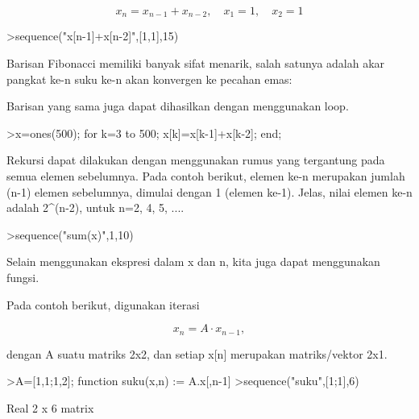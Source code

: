 \documentclass[a4paper,10pt]{article}
\begin{document}
\begin{eulernotebook}
\begin{eulercomment}
\begin{eulercomment}
\begin{eulercomment}
\end{eulercomment}
\begin{eulerformula}
\[
x_n = x_{n-1}+x_{n-2}, \quad x_1=1, \quad x_2 =1
\]
\end{eulerformula}
\begin{eulerprompt}
>sequence("x[n-1]+x[n-2]",[1,1],15)
\end{eulerprompt}
\begin{euleroutput}
  [1,  1,  2,  3,  5,  8,  13,  21,  34,  55,  89,  144,  233,  377,  610]
\end{euleroutput}
\begin{eulercomment}
Barisan Fibonacci memiliki banyak sifat menarik, salah satunya adalah akar pangkat ke-n suku
ke-n akan konvergen ke pecahan emas:
\end{eulercomment}
\begin{eulercomment}
Barisan yang sama juga dapat dihasilkan dengan menggunakan loop.
\end{eulercomment}
\begin{eulerprompt}
>x=ones(500); for k=3 to 500; x[k]=x[k-1]+x[k-2]; end;
\end{eulerprompt}
\begin{eulercomment}
Rekursi dapat dilakukan dengan menggunakan rumus yang tergantung pada semua elemen
sebelumnya. Pada contoh berikut, elemen ke-n merupakan jumlah (n-1) elemen sebelumnya,
dimulai dengan 1 (elemen ke-1). Jelas, nilai elemen ke-n adalah 2\textasciicircum{}(n-2), untuk n=2, 4, 5,
....
\end{eulercomment}
\begin{eulerprompt}
>sequence("sum(x)",1,10)
\end{eulerprompt}
\begin{euleroutput}
  [1,  1,  2,  4,  8,  16,  32,  64,  128,  256]
\end{euleroutput}
\begin{eulercomment}
Selain menggunakan ekspresi dalam x dan n, kita juga dapat menggunakan fungsi.

Pada contoh berikut, digunakan iterasi

\end{eulercomment}
\begin{eulerformula}
\[
x_n =A \cdot x_{n-1},
\]
\end{eulerformula}
\begin{eulercomment}
dengan A suatu matriks 2x2, dan setiap x[n] merupakan matriks/vektor 2x1.
\end{eulercomment}
\begin{eulerprompt}
>A=[1,1;1,2]; function suku(x,n) := A.x[,n-1]
>sequence("suku",[1;1],6)
\end{eulerprompt}
\begin{euleroutput}
  Real 2 x 6 matrix
  

\end{euleroutput}
\end{eulercomment}
\end{eulercomment}
\end{eulernotebook}
\end{document}
